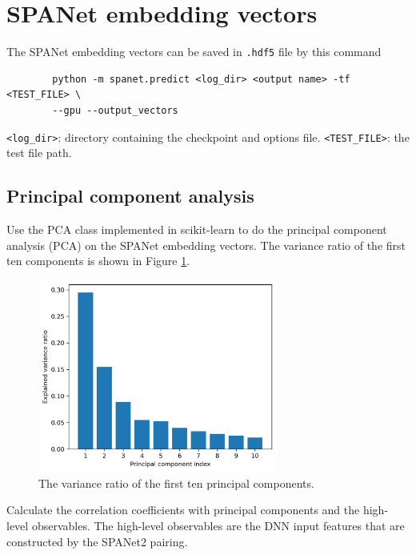 \documentclass[12pt]{article}
\begin{document}
\section{SPANet embedding vectors}%
\label{sec:spanet_embedding_vectors}
	The SPANet embedding vectors can be saved in \verb+.hdf5+ file by this command
	\begin{verbatim}
		python -m spanet.predict <log_dir> <output name> -tf <TEST_FILE> \
		--gpu --output_vectors
	\end{verbatim}
	\verb+<log_dir>+: directory containing the checkpoint and options file. \verb+<TEST_FILE>+: the test file path.

	\subsection{Principal component analysis}%
	\label{sub:principal_component_analysis}
		Use the PCA class implemented in scikit-learn to do the principal component analysis (PCA) on the SPANet embedding vectors. The variance ratio of the first ten components is shown in Figure \ref{fig:PCA_variance_ratio}.
		\begin{figure}[htpb]
			\centering
			\includegraphics[width=0.7\textwidth]{PCA_variance_ratio.png}
			\caption{The variance ratio of the first ten principal components.}
			\label{fig:PCA_variance_ratio}
		\end{figure}

		Calculate the correlation coefficients with principal components and the high-level observables. The high-level observables are the DNN input features that are constructed by the SPANet2 pairing.
\end{document}
